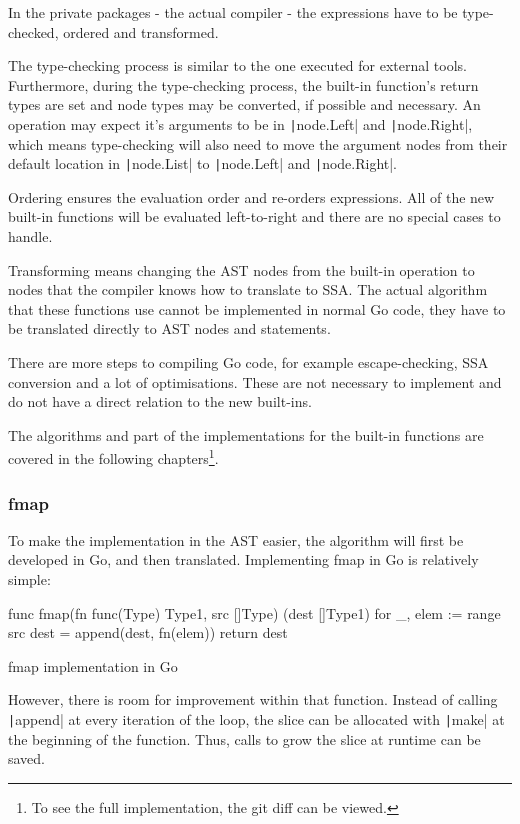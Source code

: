 In the private packages - the actual compiler - the expressions have to be
type-checked, ordered and transformed.

The type-checking process is similar to the one executed for external tools.
Furthermore, during the type-checking
process, the built-in function's return types are set and node types
may be converted, if possible and necessary.
An operation may expect it's arguments to be in \texttt|node.Left|
and \texttt|node.Right|, which means type-checking will also need
to move the argument nodes from their default location in
\texttt|node.List| to \texttt|node.Left| and
\texttt|node.Right|.

Ordering ensures the evaluation order and re-orders expressions. All of
the new built-in functions will be evaluated left-to-right and there are no
special cases to handle.

Transforming means changing the AST nodes from the built-in operation to
nodes that the compiler knows how to translate to SSA. The actual algorithm
that these functions use cannot be implemented in normal Go code, they have to be
translated directly to AST nodes and statements.

There are more steps to compiling Go code, for example escape-checking,
SSA conversion and a lot of optimisations. These are not necessary to
implement and do not have a direct relation to the new built-ins.

The algorithms and part of the implementations for the built-in
functions are covered in the following chapters\footnote{
	To see the full implementation, the git diff can be viewed\autocite{ba-go1-14-thesis-diff}.
}.

\subsubsection{fmap}\label{ch:impl-fmap}

To make the implementation in the AST easier, the algorithm will first be
developed in Go, and then translated. Implementing fmap in Go is relatively
simple:

\begin{listing}
	\begin{gocode}
func fmap(fn func(Type) Type1, src []Type) (dest []Type1) {
	for _, elem := range src {
		dest = append(dest, fn(elem))
	}
	return dest
}
\end{gocode}
	\caption{fmap implementation in Go}\label{code:fmap-go}
\end{listing}
However, there is room for improvement within that function. Instead
of calling \texttt|append| at every iteration of the loop, the slice can
be allocated with \texttt|make| at the beginning of the function. Thus,
calls to grow the slice at runtime can be saved.

